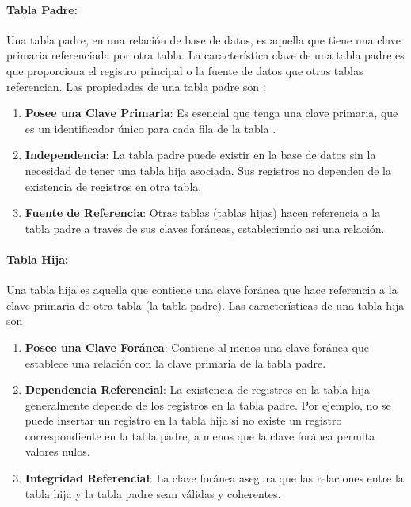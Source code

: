     \paragraph{Tabla Padre:} Una tabla padre, en una relación de base de datos, es aquella que tiene una clave primaria referenciada por otra tabla. La característica clave de una tabla padre es que proporciona el registro principal o la fuente de datos que otras tablas referencian. Las propiedades de una tabla padre son :

    \begin{enumerate}
        \item \textbf{Posee una Clave Primaria}: Es esencial que tenga una clave primaria, que es un identificador único para cada fila de la tabla .
        \item \textbf{Independencia}: La tabla padre puede existir en la base de datos sin la necesidad de tener una tabla hija asociada. Sus registros no dependen de la existencia de registros en otra tabla.
        \item \textbf{Fuente de Referencia}: Otras tablas (tablas hijas) hacen referencia a la tabla padre a través de sus claves foráneas, estableciendo así una relación.
    \end{enumerate}

    \paragraph{Tabla Hija:} Una tabla hija es aquella que contiene una clave foránea que hace referencia a la clave primaria de otra tabla (la tabla padre). Las características de una tabla hija son
    \begin{enumerate}
        \item \textbf{Posee una Clave Foránea}: Contiene al menos una clave foránea que establece una relación con la clave primaria de la tabla padre.
        \item \textbf{Dependencia Referencial}: La existencia de registros en la tabla hija generalmente depende de los registros en la tabla padre. Por ejemplo, no se puede insertar un registro en la tabla hija si no existe un registro correspondiente en la tabla padre, a menos que la clave foránea permita valores nulos.
        \item \textbf{Integridad Referencial}: La clave foránea asegura que las relaciones entre la tabla hija y la tabla padre sean válidas y coherentes.
    \end{enumerate}

